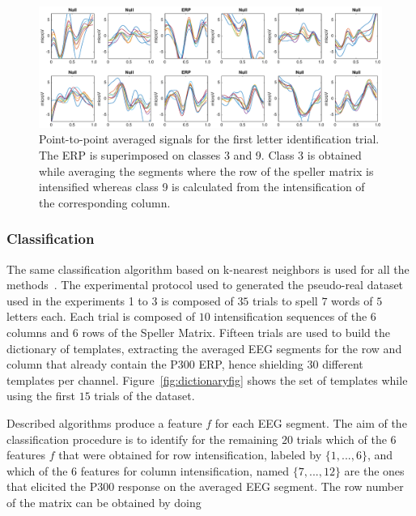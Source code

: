 \documentclass[brainsci,article,submit,moreauthors,pdftex,10pt,a4paper]{mdpi}
\begin{document}
\begin{figure}[H]
\centering
\includegraphics[width=1.0\linewidth]{images/GainCheck.eps}
\caption{Point-to-point averaged signals for the first letter identification trial.  The ERP is superimposed on classes 3 and 9.  Class 3 is obtained while averaging the segments where the row of the speller matrix is intensified whereas class 9 is calculated from the intensification of the corresponding column.}
\label{fig:gaincheck}
\end{figure}


\subsubsection{Classification} \label{section:classification}

The same classification algorithm based on k-nearest neighbors is used for all the methods~\citep{Boiman2008}.   The experimental protocol used to generated the pseudo-real dataset used in the experiments 1 to 3 is composed of $35$ trials to spell $7$ words of $5$ letters each.  Each trial is composed of $10$ intensification sequences of the $6$ columns and $6$ rows of the Speller Matrix.  Fifteen trials are used to build the dictionary of templates, extracting the averaged EEG segments for the row and column that already contain the P300 ERP, hence shielding $30$ different templates per channel.  Figure~\ref{fig:dictionaryfig} shows the set of templates while using the first $15$ trials of the dataset.

Described algorithms produce a feature $f$ for each EEG segment.  The aim of the classification procedure is to identify for the remaining $20$ trials which of the 6 features $f$ that were obtained for row intensification, labeled by $\{ 1,...,6 \}$, and which of the 6 features for column intensification, named $\{ 7,...,12 \}$ are the ones that elicited the P300 response on the averaged EEG segment. The row number of the matrix can be obtained by doing
\end{document}
